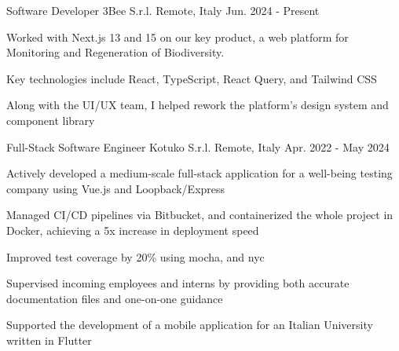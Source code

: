 
\begin{cventries}

	\cventry
	{Software Developer} %
	{3Bee S.r.l.} %
	{Remote, Italy} %
	{Jun. 2024 - Present} %
	{
		\begin{cvitems} %
			\item {Worked with Next.js 13 and 15 on our key product, a web platform for Monitoring and Regeneration of Biodiversity.}
			\item {Key technologies include React, TypeScript, React Query, and Tailwind CSS}
			\item {Along with the UI/UX team, I helped rework the platform's design system and component library}
		\end{cvitems}
	}

	\cventry
	{Full-Stack Software Engineer} %
	{Kotuko S.r.l.} %
	{Remote, Italy} %
	{Apr. 2022 - May 2024} %
	{
		\begin{cvitems} %
			\item {Actively developed a medium-scale full-stack application for a well-being testing company using Vue.js and Loopback/Express}
			\item {Managed CI/CD pipelines via Bitbucket, and containerized the whole project in Docker, achieving a 5x increase in deployment speed}
			\item {Improved test coverage by 20\% using mocha, and nyc}
			\item {Supervised incoming employees and interns by providing both accurate documentation files and one-on-one guidance}
			\item {Supported the development of a mobile application for an Italian University written in Flutter}
		\end{cvitems}
	}


\end{cventries}
